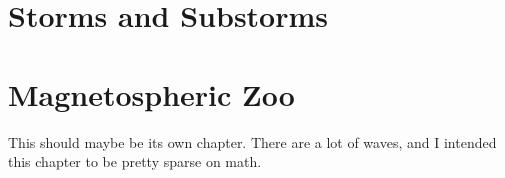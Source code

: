 \section{Storms and Substorms}


\section{Magnetospheric Zoo}

This should maybe be its own chapter. There are a lot of waves, and I intended this chapter to be pretty sparse on math. 









